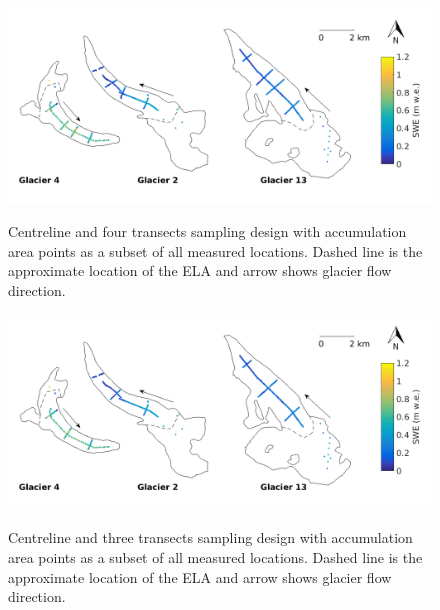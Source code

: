 \documentclass[12pt]{article}
\begin{document}
\begin{figure}[H]
	\centering
	\includegraphics[width =\textwidth]{SamplingDesign_ACentreTransect4.png}\\
	\caption{Centreline and four transects sampling design with accumulation area points  as a subset of all measured locations. Dashed line is the approximate location of the ELA and arrow shows glacier flow direction.}
	\label{fig:SamplingDesign_ACentreTransect4}
\end{figure}

\begin{figure}[H]
	\centering
	\includegraphics[width =\textwidth]{SamplingDesign_ACentreTransect3.png}\\
	\caption{Centreline and three transects sampling design with accumulation area points  as a subset of all measured locations. Dashed line is the approximate location of the ELA and arrow shows glacier flow direction.}
	\label{fig:SamplingDesign_ACentreTransect3}
\end{figure}
\end{document}
